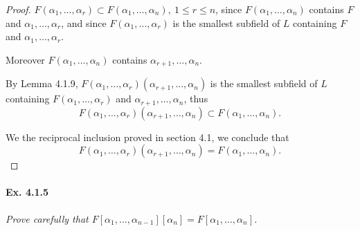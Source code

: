 \documentclass[11pt,a4paper]{article}
\begin{document}
\begin{proof}  $F(\alpha_1,\ldots,\alpha_r) \subset F(\alpha_1,\ldots,\alpha_n),\ 1\leq r \leq n$, since $F(\alpha_1,\ldots,\alpha_n)$ contains $F$ and $\alpha_1,\ldots,\alpha_r$, and since $F(\alpha_1,\ldots,\alpha_r)$ is the smallest subfield of $L$ containing $F$ and $\alpha_1,\ldots,\alpha_r$.

Moreover $F(\alpha_1,\ldots,\alpha_n)$ contains $\alpha_{r+1}, \ldots, \alpha_n$.

By Lemma 4.1.9, $F(\alpha_1,\ldots,\alpha_r)(\alpha_{r+1},\ldots,\alpha_n)$ is the smallest subfield of $L$ containing $F(\alpha_1,\ldots,\alpha_r)$ and $\alpha_{r+1},\ldots,\alpha_n$, thus 
$$F(\alpha_1,\ldots,\alpha_r)(\alpha_{r+1},\ldots,\alpha_n) \subset F(\alpha_1,\ldots,\alpha_n).$$

We the reciprocal inclusion proved in section 4.1, we conclude that
$$F(\alpha_1,\ldots,\alpha_r)(\alpha_{r+1},\ldots,\alpha_n) = F(\alpha_1,\ldots,\alpha_n).$$
\end{proof}

\paragraph{Ex. 4.1.5}

{\it Prove carefully that $F[\alpha_1,\ldots,\alpha_{n-1}][\alpha_n] = F[\alpha_1,\ldots,\alpha_n]$.
}
\end{document}

